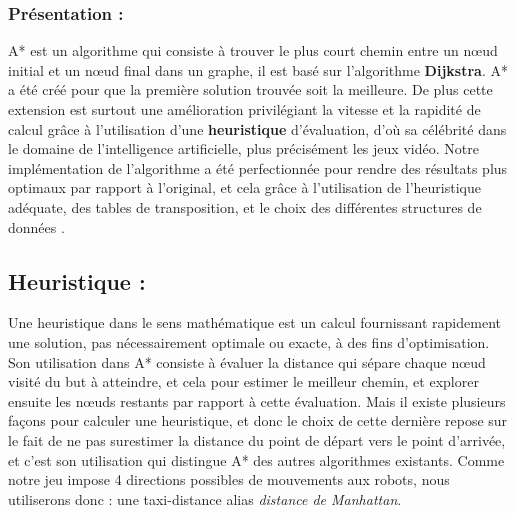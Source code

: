 \documentclass[12pt, a4paper, openany]{article}
\begin{document}
\subsubsection{Présentation : }
A* est un algorithme qui consiste à trouver le plus court chemin entre un nœud initial et un nœud final dans un graphe, il est basé sur l’algorithme \textbf{Dijkstra}. A* a été créé pour que la première solution trouvée soit la meilleure. De plus cette extension est surtout une amélioration privilégiant la vitesse et la rapidité de calcul grâce à l'utilisation d'une \textbf{heuristique} d'évaluation, d'où sa célébrité dans le domaine de l'intelligence artificielle, plus précisément les jeux vidéo. Notre implémentation de l'algorithme a été perfectionnée pour rendre des résultats plus optimaux par rapport à l'original, et cela grâce à l'utilisation de l'heuristique adéquate, des tables de transposition, et le choix des différentes structures de données .


\subsection{Heuristique :}
Une heuristique dans le sens mathématique est un calcul fournissant rapidement une solution, pas nécessairement optimale ou exacte, à des fins d'optimisation.
Son utilisation dans A* consiste à évaluer la distance qui sépare chaque nœud visité du but à atteindre, et cela pour estimer le meilleur chemin, et explorer ensuite les nœuds restants par rapport à cette évaluation.
Mais il existe plusieurs façons pour calculer une heuristique, et donc le choix de cette dernière repose sur le fait de ne pas surestimer la distance du point de départ vers le point d'arrivée, et c'est son utilisation qui distingue A* des autres algorithmes existants.
Comme notre jeu impose 4 directions possibles de mouvements aux robots, nous utiliserons donc : une taxi-distance alias \textit{distance de Manhattan}.
\end{document}
